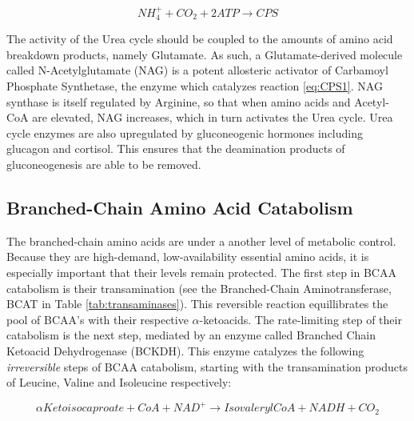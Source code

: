 \documentclass{tufte-handout}
\begin{document}
\begin{equation}\label{eq:CPS1}
 NH_4^+ + CO_2 + 2 ATP \rightarrow  CPS
\end{equation}

  The activity of the Urea cycle should be coupled to the amounts of amino acid breakdown products, namely Glutamate.  As such, a Glutamate-derived molecule called N-Acetylglutamate (NAG) is a potent allosteric activator of Carbamoyl Phosphate Synthetase, the enzyme which catalyzes reaction \ref{eq:CPS1}.  NAG synthase is itself regulated by Arginine, so that when amino acids and Acetyl-CoA are elevated, NAG increases, which in turn activates the Urea cycle.  Urea cycle enzymes are also upregulated by gluconeogenic hormones including glucagon and cortisol.  This ensures that the deamination products of gluconeogenesis are able to be removed.

\subsection{Branched-Chain Amino Acid Catabolism}

The branched-chain amino acids are under a another level of metabolic control.  Because they are high-demand, low-availability essential amino acids, it is especially important that their levels remain protected.  The first step in BCAA catabolism is their transamination (see the Branched-Chain Aminotransferase, BCAT in Table \ref{tab:transaminases}).  This reversible reaction equillibrates the pool of BCAA's with their respective $\alpha$-ketoacids.  The rate-limiting step of their catabolism is the next step, mediated by an enzyme called Branched Chain Ketoacid Dehydrogenase (BCKDH).  This enzyme catalyzes the following \emph{irreversible} steps of BCAA catabolism, starting with the transamination products of Leucine, Valine and Isoleucine respectively:

\begin{equation}\label{eq:leu}
\alpha Ketoisocaproate + CoA + NAD^+ \rightarrow IsovalerylCoA + NADH + CO_2
\end{equation}
\end{document}
